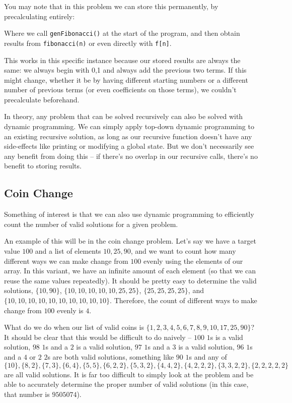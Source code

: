 You may note that in this problem we can store this permanently, by precalculating entirely:


Where we call \texttt{genFibonacci()} at the start of the program, and then obtain results from \texttt{fibonacci(n)} or even directly with \texttt{f[n]}.

This works in this specific instance because our stored results are always the same: we always begin with {0,1} and always add the previous two terms. If this might change, whether it be by having different starting numbers or a different number of previous terms (or even coefficients on those terms), we couldn't precalculate beforehand.

In theory, any problem that can be solved recursively can also be solved with dynamic programming. We can simply apply top-down dynamic programming to an existing recursive solution, as long as our recursive function doesn't have any side-effects like printing or modifying a global state. But we don't necessarily see any benefit from doing this -- if there's no overlap in our recursive calls, there's no benefit to storing results.

\subsection{Coin Change}

Something of interest is that we can also use dynamic programming to efficiently count the number of valid solutions for a given problem.

An example of this will be in the coin change problem. Let's say we have a target value $100$ and a list of elements $10,25,90$, and we want to count how many different ways we can make change from $100$ evenly using the elements of our array. In this variant, we have an infinite amount of each element (so that we can reuse the same values repeatedly). It should be pretty easy to determine the valid solutions, $\{10,90\}$, $\{10,10,10,10,10,25,25\}$, $\{25,25,25,25\}$, and $\{10,10,10,10,10,10,10,10,10,10\}$. Therefore, the count of different ways to make change from $100$ evenly is $4$.

What do we do when our list of valid coins is $\{1,2,3,4,5,6,7,8,9,10,17,25,90\}$? It should be clear that this would be difficult to do naively -- $100$ $1$s is a valid solution, $98$ $1$s and a $2$ is a valid solution, $97$ $1$s and a $3$ is a valid solution, $96$ $1$s and a $4$ or $2$ $2$s are both valid solutions, something like $90$ $1$s and any of $\{10\},\{8,2\},\{7,3\},\{6,4\},\{5,5\},\{6,2,2\},\{5,3,2\},\{4,4,2\},\{4,2,2,2\},\{3,3,2,2\},\{2,2,2,2,2\}$ are all valid solutions. It is far too difficult to simply look at the problem and be able to accurately determine the proper number of valid solutions (in this case, that number is $9505074$).

